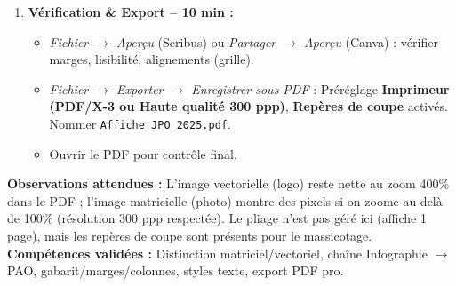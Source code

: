 \documentclass[11pt]{article}
\begin{document}
\begin{experience}
\begin{enumerate}
\begin{enumerate}
\item \textbf{Image centrale :} Insérer cadre image (\textit{Fichier $\rightarrow$ Importer}), choisir \texttt{photo\_batiment\_ok.jpg}, ajuster \textit{Échelle au cadre} (proportions conservées).
\item \textbf{Bloc infos (Date, Lieu, Heure) :} Cadre texte sous l'image, police \texttt{Montserrat Regular} 18 pt, interligne 1.4, puces \texttt{$\bullet$}. Couleur \texttt{Gris foncé} (\#333333).
\item \textbf{Logo + Contact bas :} Insérer \texttt{logo\_ecole\_cmyk.svg} (cadre image vectoriel), à gauche. Cadre texte à droite : « Lycée de Biyem-Assi $\mid$ BP 123 Yaoundé $\mid$ www.lycee-biyem.cm », police 14 pt.
\item \textbf{Habillage :} Vérifier que le texte ne chevauche pas l'image (Scribus : \textit{Propriétés $\rightarrow$ Forme $\rightarrow$ Type de contour $\rightarrow$ Cadre de l'image}).
\end{enumerate}
\item \textbf{Vérification \& Export -- 10 min :}
\begin{itemize}
\item \textit{Fichier $\rightarrow$ Aperçu} (Scribus) ou \textit{Partager $\rightarrow$ Aperçu} (Canva) : vérifier marges, lisibilité, alignements (grille).
\item \textit{Fichier $\rightarrow$ Exporter $\rightarrow$ Enregistrer sous PDF} : Préréglage \textbf{Imprimeur (PDF/X-3 ou Haute qualité 300 ppp)}, \textbf{Repères de coupe} activés. Nommer \texttt{Affiche\_JPO\_2025.pdf}.
\item Ouvrir le PDF pour contrôle final.
\end{itemize}
\end{enumerate}
\textbf{Observations attendues :} L'image vectorielle (logo) reste nette au zoom 400\% dans le PDF ; l'image matricielle (photo) montre des pixels si on zoome au-delà de 100\% (résolution 300 ppp respectée). Le pliage n'est pas géré ici (affiche 1 page), mais les repères de coupe sont présents pour le massicotage.
\textbf{Compétences validées :} Distinction matriciel/vectoriel, chaîne Infographie $\rightarrow$ PAO, gabarit/marges/colonnes, styles texte, export PDF pro.
\end{experience}
\end{document}
